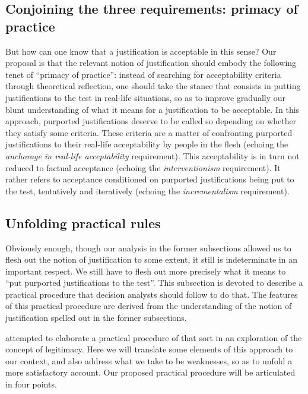 \documentclass[preprint, french, english, 11pt, authoryear]{elsarticle}%
\begin{document}
\subsection{Conjoining the three requirements: primacy of practice}
But how can one know that a justification is acceptable in this sense? %
Our proposal is that the relevant notion of justification should embody the following tenet of “primacy of practice”: instead of searching for acceptability criteria through theoretical reflection, one should take the stance that consists in putting justifications to the test in real-life situations, so as to improve gradually our blunt understanding of what it means for a justification to be acceptable. In this approach, purported justifications deserve to be called so depending on whether they satisfy some criteria. These criteria are a matter of confronting purported justifications to their real-life acceptability by people in the flesh (echoing the \emph{anchorage in real-life acceptability} requirement). This acceptability is in turn not reduced to factual acceptance (echoing the \emph{interventionism} requirement). It rather refers to acceptance conditioned on purported justifications being put to the test, tentatively and iteratively (echoing the \emph{incrementalism} requirement).

\subsection{Unfolding practical rules}
Obviously enough, though our analysis in the former subsections allowed us to flesh out the notion of justification to some extent, it still is indeterminate in an important respect. We still have to flesh out more precisely what it means to ``put purported justifications to the test''. This subsection is devoted to describe a practical procedure that decision analysts should follow to do that. The features of this practical procedure are derived from the understanding of the notion of justification spelled out in the former subsections.

\citet{meinard_what_2017} attempted to elaborate a practical procedure of that sort in an exploration of the concept of legitimacy. Here we will translate some elements of this approach to our context, and also address what we take to be weaknesses, so as to unfold a more satisfactory account. Our proposed practical procedure will be articulated in four points.
\end{document}
